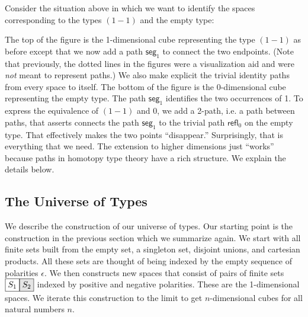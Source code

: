 \documentclass[authoryear,preprint]{sigplanconf}
\newcommand{\refl}[1]{\textsf{refl}_{#1}}
\newcommand{\seg}[1]{\textsf{seg}_{#1}}
\newcommand{\mm}{\texttt{-}}
\newcommand{\pp}{\texttt{+}}
\newcommand{\nodet}[2]{\fcolorbox{black}{white}{$#1$}\fcolorbox{black}{gray!20}{$#2$}}
\begin{document}
Consider the situation above in which we want to identify the spaces
corresponding to the types $(1-1)$ and the empty type:
\begin{center}
\end{center}
The top of the figure is the 1-dimensional cube representing the type $(1-1)$
as before except that we now add a path $\seg{1}$ to connect the two
endpoints. (Note that previously, the dotted lines in the figures were a
visualization aid and were \emph{not} meant to represent paths.) We also make
explicit the trivial identity paths from every space to itself.  The bottom
of the figure is the 0-dimensional cube representing the empty type. The path
$\seg{1}$ identifies the two occurrences of 1. To express the
equivalence of $(1-1)$ and 0, we add a 2-path, i.e. a path between paths,
that asserts connects the path $\seg{1}$ to the trivial path
$\refl{0}$ on the empty type. That effectively makes the two points
``disappear.''  Surprisingly, that is everything that we need. The extension
to higher dimensions just ``works'' because paths in homotopy type theory
have a rich structure. We explain the details below.

\subsection{The Universe of Types}

We describe the construction of our universe of types. Our starting point is
the construction in the previous section which we summarize again. We start
with all finite sets built from the empty set, a singleton set, disjoint
unions, and cartesian products. All these sets are thought of being indexed
by the empty sequence of polarities $\epsilon$. We then constructs new spaces
that consist of pairs of finite sets $\nodet{S_1}{S_2}$ indexed by positive
and negative polarities. These are the 1-dimensional spaces. We iterate this
construction to the limit to get $n$-dimensional cubes for all natural
numbers $n$.
\end{document}
